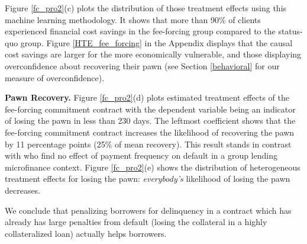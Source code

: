 \documentclass[oneside,11pt]{article}
\begin{document}
Figure \ref{fc_pro2}(c) plots the distribution of those treatment effects using this machine learning methodology. It shows that more than 90\% of clients experienced financial cost savings in the fee-forcing group compared to the status-quo group. Figure \ref{HTE_fee_forcing} in the Appendix displays that the causal cost savings are larger for the more economically vulnerable, %
and those displaying overconfidence about recovering their pawn (see Section \ref{behavioral} for our measure of overconfidence).

\vspace{.2in}
\noindent \textbf{Pawn Recovery.} Figure \ref{fc_pro2}(d) plots estimated treatment effects of the fee-forcing commitment contract with the dependent variable being an indicator of losing the pawn in less than 230 days. The leftmost coefficient shows that the fee-forcing commitment contract increases the likelihood of recovering the pawn by 11 percentage points (25\% of mean recovery). This result stands in contrast with \cite{Pande} who find no effect of payment frequency on default in a group lending microfinance context. Figure \ref{fc_pro2}(e) shows the distribution of heterogeneous treatment effects for losing the pawn: \textit{everybody's} likelihood of losing the pawn decreases. %


\vspace{.2in}
\noindent We conclude that penalizing borrowers for delinquency in a contract which has already has large penalties from default (losing the collateral in a highly collateralized loan) actually helps borrowers.
\end{document}
